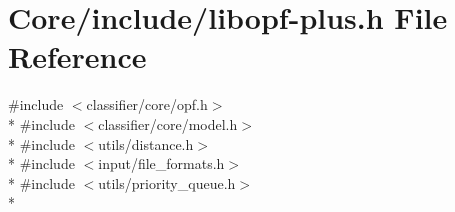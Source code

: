 \hypertarget{libopf-plus_8h}{\section{Core/include/libopf-\/plus.h File Reference}
\label{libopf-plus_8h}
}
{\ttfamily \#include $<$classifier/core/opf.\+h$>$}\\*
{\ttfamily \#include $<$classifier/core/model.\+h$>$}\\*
{\ttfamily \#include $<$utils/distance.\+h$>$}\\*
{\ttfamily \#include $<$input/file\+\_\+formats.\+h$>$}\\*
{\ttfamily \#include $<$utils/priority\+\_\+queue.\+h$>$}\\*

